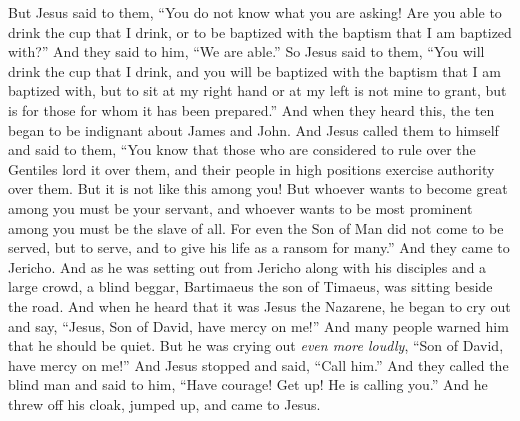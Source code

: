 \begin{biblechapter}
\verse But Jesus said to them, “You do not know what you are asking! Are you able to drink the cup that I drink, or to be baptized with the baptism that I am baptized with?”
\verse And they said to him, “We are able.” So Jesus said to them, “You will drink the cup that I drink, and you will be baptized with the baptism that I am baptized with,
\verse but to sit at my right hand or at my left is not mine to grant, but is for those for whom it has been prepared.”
\verse And when they heard this, the ten began to be indignant about James and John.
\verse And Jesus called them to himself and said to them, “You know that those who are considered to rule over the Gentiles lord it over them, and their people in high positions exercise authority over them.
\verse But it is not like this among you! But whoever wants to become great among you must be your servant,
\verse and whoever wants to be most prominent among you must be the slave of all.
\verse For even the Son of Man did not come to be served, but to serve, and to give his life as a ransom for many.”
 And they came to Jericho. And as he was setting out from Jericho along with his disciples and a large crowd, a blind beggar, Bartimaeus the son of Timaeus, was sitting beside the road.
\verse And when he heard that it was Jesus the Nazarene, he began to cry out and say, “Jesus, Son of David, have mercy on me!”
\verse And many people warned him that he should be quiet. But he was crying out \textit{even more loudly}, “Son of David, have mercy on me!”
\verse And Jesus stopped and said, “Call him.” And they called the blind man and said to him, “Have courage! Get up! He is calling you.”
\verse And he threw off his cloak, jumped up, and came to Jesus.

\end{biblechapter}
